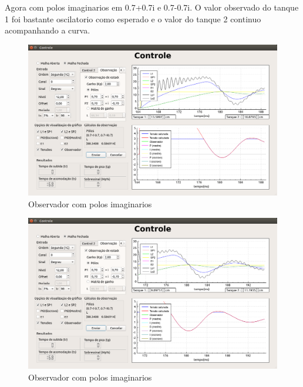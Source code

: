 \documentclass[a4paper,12pt]{article}
\begin{document}
\hspace{4ex} Agora com polos imaginarios em 0.7+0.7i e 0.7-0.7i. O valor observado do tanque 1 foi bastante oscilatorio como esperado e o valor do tanque 2 continuo acompanhando a curva.
\begin{figure}[!h]
\centering
\includegraphics[width=14cm]{FotosObservador/PoloImaginario2}
\caption{Observador com polos imaginarios}
\label{img3}
\end{figure}
\begin{figure}[!h]
\centering
\includegraphics[width=14cm]{FotosObservador/PoloImaginario1}
\caption{Observador com polos imaginarios}
\label{img4}
\end{figure}
\end{document}
